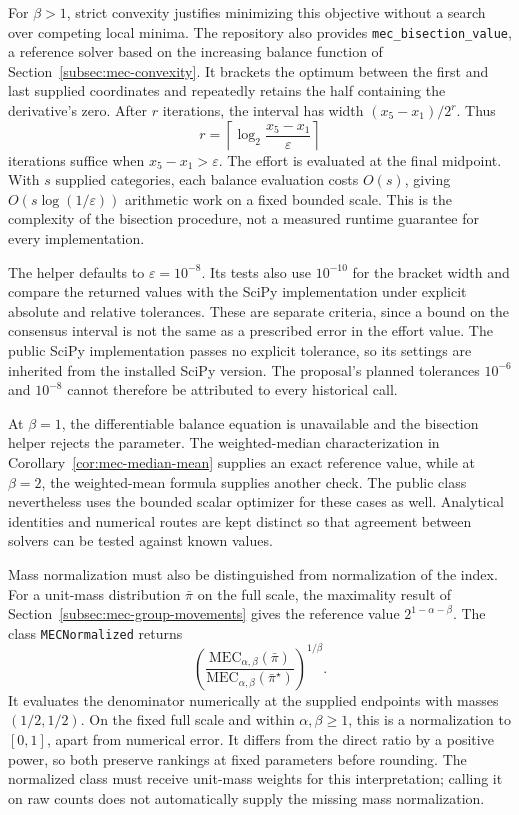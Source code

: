 \documentclass{article}
\theoremstyle{plain}
\theoremstyle{remark}
\begin{document}
For $\beta>1$, strict convexity justifies minimizing this objective without a search over competing local minima. The repository also provides \texttt{mec\_\allowbreak bisection\_\allowbreak value}, a reference solver based on the increasing balance function of Section~\ref{subsec:mec-convexity}. It brackets the optimum between the first and last supplied coordinates and repeatedly retains the half containing the derivative's zero. After $r$ iterations, the interval has width $(x_5-x_1)/2^r$. Thus
\[
r=\left\lceil\log_2\frac{x_5-x_1}{\varepsilon}\right\rceil
\]
iterations suffice when $x_5-x_1>\varepsilon$. The effort is evaluated at the final midpoint. With $s$ supplied categories, each balance evaluation costs $O(s)$, giving $O(s\log(1/\varepsilon))$ arithmetic work on a fixed bounded scale. This is the complexity of the bisection procedure, not a measured runtime guarantee for every implementation.

The helper defaults to $\varepsilon=10^{-8}$. Its tests also use $10^{-10}$ for the bracket width and compare the returned values with the SciPy implementation under explicit absolute and relative tolerances. These are separate criteria, since a bound on the consensus interval is not the same as a prescribed error in the effort value. The public SciPy implementation passes no explicit tolerance, so its settings are inherited from the installed SciPy version. The proposal's planned tolerances $10^{-6}$ and $10^{-8}$ cannot therefore be attributed to every historical call.

At $\beta=1$, the differentiable balance equation is unavailable and the bisection helper rejects the parameter. The weighted-median characterization in Corollary~\ref{cor:mec-median-mean} supplies an exact reference value, while at $\beta=2$, the weighted-mean formula supplies another check. The public class nevertheless uses the bounded scalar optimizer for these cases as well. Analytical identities and numerical routes are kept distinct so that agreement between solvers can be tested against known values.

Mass normalization must also be distinguished from normalization of the index. For a unit-mass distribution $\bar\pi$ on the full scale, the maximality result of Section~\ref{subsec:mec-group-movements} gives the reference value $2^{1-\alpha-\beta}$. The class \texttt{MECNormalized} returns
\begin{equation}\label{eq:methods-root-normalization}
\left(\frac{\mathrm{MEC}_{\alpha,\beta}(\bar\pi)}
{\mathrm{MEC}_{\alpha,\beta}(\bar\pi^\star)}\right)^{1/\beta}.
\end{equation}
It evaluates the denominator numerically at the supplied endpoints with masses $(1/2,1/2)$. On the fixed full scale and within $\alpha,\beta\geq1$, this is a normalization to $[0,1]$, apart from numerical error. It differs from the direct ratio by a positive power, so both preserve rankings at fixed parameters before rounding. The normalized class must receive unit-mass weights for this interpretation; calling it on raw counts does not automatically supply the missing mass normalization.
\end{document}
